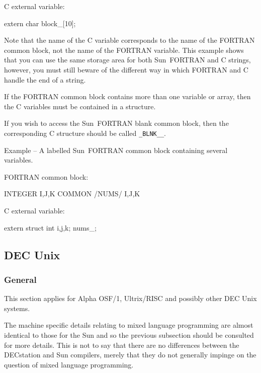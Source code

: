 \documentclass[twoside,11pt,nolof]{starlink}
\newcounter{examples}
\begin{document}
C external variable:
\nopagebreak[4]
\begin{small}
\begin{terminalv}
extern char block_[10];
\end{terminalv}
\end{small}

Note that the name of the C variable corresponds to the name of the FORTRAN
common block, not the name of the FORTRAN variable. This example shows that you
can use the same storage area for both Sun~FORTRAN and C strings, however, you
must still beware of the different way in which FORTRAN and C handle the end of
a string.

If the FORTRAN common block contains more than one variable or array, then the
C variables must be contained in a structure.

If you wish to access the Sun~FORTRAN blank common block, then the
corresponding C structure should be called \texttt{\_BLNK\_\_}.

\label{sun_common2}
\begin{center}
Example\latex{~\ref{sun_common2}}
-- A labelled Sun~FORTRAN common block containing several variables.
\end{center}
\nopagebreak[4]
FORTRAN common block:
\nopagebreak[4]
\begin{small}
\begin{terminalv}
      INTEGER I,J,K
      COMMON /NUMS/ I,J,K
\end{terminalv}
\end{small}

C external variable:
\nopagebreak[4]
\begin{small}
\begin{terminalv}
extern struct { int i,j,k; } nums_;
\end{terminalv}
\end{small}

\subsection{DEC Unix}
\subsubsection{General}
This section applies for Alpha OSF/1, Ultrix/RISC and possibly other DEC
Unix systems.

The machine specific details relating to mixed language programming are
almost identical to those for the Sun and so the previous subsection should be
consulted for more details. This is not to say that there are no differences
between the DECstation and Sun compilers, merely that they do not generally
impinge on the question of mixed language programming.
\end{document}
